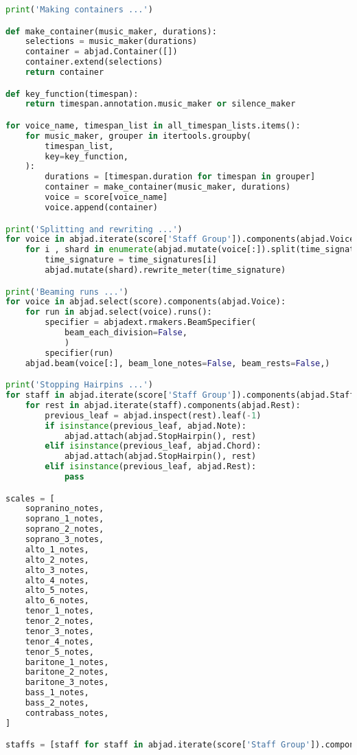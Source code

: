 \begin{lstlisting}[language=Python, caption=Invocation Source Code]
print('Making containers ...')

def make_container(music_maker, durations):
    selections = music_maker(durations)
    container = abjad.Container([])
    container.extend(selections)
    return container

def key_function(timespan):
    return timespan.annotation.music_maker or silence_maker

for voice_name, timespan_list in all_timespan_lists.items():
    for music_maker, grouper in itertools.groupby(
        timespan_list,
        key=key_function,
    ):
        durations = [timespan.duration for timespan in grouper]
        container = make_container(music_maker, durations)
        voice = score[voice_name]
        voice.append(container)

print('Splitting and rewriting ...')
for voice in abjad.iterate(score['Staff Group']).components(abjad.Voice):
    for i , shard in enumerate(abjad.mutate(voice[:]).split(time_signatures)):
        time_signature = time_signatures[i]
        abjad.mutate(shard).rewrite_meter(time_signature)

print('Beaming runs ...')
for voice in abjad.select(score).components(abjad.Voice):
    for run in abjad.select(voice).runs():
        specifier = abjadext.rmakers.BeamSpecifier(
            beam_each_division=False,
            )
        specifier(run)
    abjad.beam(voice[:], beam_lone_notes=False, beam_rests=False,)

print('Stopping Hairpins ...')
for staff in abjad.iterate(score['Staff Group']).components(abjad.Staff):
    for rest in abjad.iterate(staff).components(abjad.Rest):
        previous_leaf = abjad.inspect(rest).leaf(-1)
        if isinstance(previous_leaf, abjad.Note):
            abjad.attach(abjad.StopHairpin(), rest)
        elif isinstance(previous_leaf, abjad.Chord):
            abjad.attach(abjad.StopHairpin(), rest)
        elif isinstance(previous_leaf, abjad.Rest):
            pass

scales = [
    sopranino_notes,
    soprano_1_notes,
    soprano_2_notes,
    soprano_3_notes,
    alto_1_notes,
    alto_2_notes,
    alto_3_notes,
    alto_4_notes,
    alto_5_notes,
    alto_6_notes,
    tenor_1_notes,
    tenor_2_notes,
    tenor_3_notes,
    tenor_4_notes,
    tenor_5_notes,
    baritone_1_notes,
    baritone_2_notes,
    baritone_3_notes,
    bass_1_notes,
    bass_2_notes,
    contrabass_notes,
]

staffs = [staff for staff in abjad.iterate(score['Staff Group']).components(abjad.Staff)]


\end{lstlisting}

